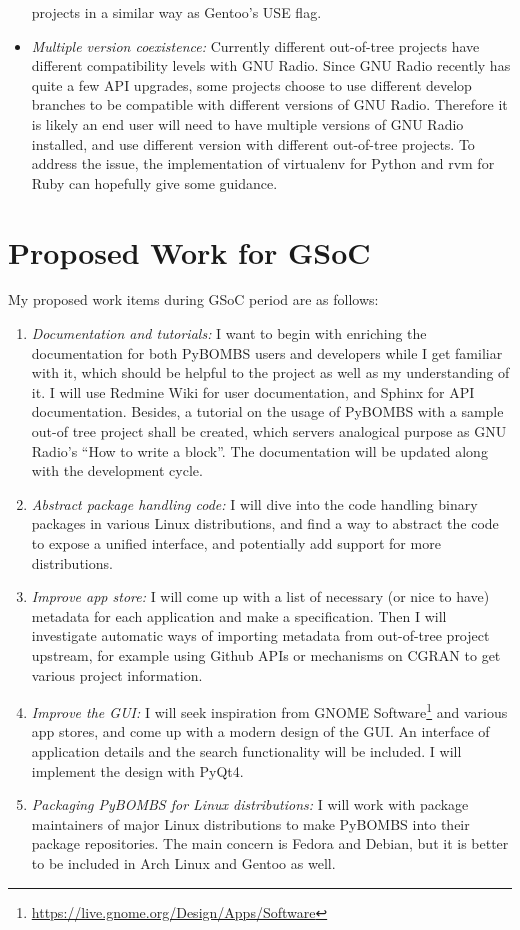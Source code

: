 \documentclass[a4paper]{article}
\begin{document}
\begin{itemize}
    projects in a similar way as Gentoo's USE flag.
  \item \emph{Multiple version coexistence:} Currently different
    out-of-tree projects have different compatibility levels with GNU
    Radio. Since GNU Radio recently has quite a few API upgrades,
    some projects choose to use different develop branches to be
    compatible with different versions of GNU Radio. Therefore it is
    likely an end user will need to have multiple versions of GNU Radio
    installed, and use different version with different out-of-tree
    projects. To address the issue, the implementation of
    virtualenv for Python and rvm for Ruby can hopefully give some guidance.
\end{itemize}

\section{Proposed Work for GSoC}

My proposed work items during GSoC period are as follows:

\begin{enumerate}
  \item \emph{Documentation and tutorials:} I want to begin with
    enriching the documentation for both PyBOMBS users and developers
    while I get familiar with it, which should be helpful to the
    project as well as my understanding of it. I will use Redmine Wiki
    for user documentation, and Sphinx for API documentation.
    Besides, a tutorial on the usage of PyBOMBS with a sample out-of\-
    tree project shall be created, which servers analogical purpose as
    GNU Radio's ``How to write a block''. The documentation will be
    updated along with the development cycle.
  \item \emph{Abstract package handling code:} I will dive into the
    code handling binary packages in various Linux distributions, and
    find a way to abstract the code to expose a unified interface, and
    potentially add support for more distributions.
  \item \emph{Improve app store:} I will come up with a list of
    necessary (or nice to have) metadata for each application and make a
    specification. Then I will investigate automatic ways of importing
    metadata from out-of-tree project upstream, for example using Github
    APIs or mechanisms on CGRAN to get various project information.
  \item \emph{Improve the GUI:} I will seek inspiration from GNOME
    Software\footnote{\url{https://live.gnome.org/Design/Apps/Software}}
    and various app stores, and come up with a modern design
    of the GUI. An interface of application details and the search
    functionality will be included. I will implement the design with
    PyQt4.
  \item \emph{Packaging PyBOMBS for Linux distributions:} I will
    work with package maintainers of major Linux distributions to make
    PyBOMBS into their package repositories. The main concern is Fedora
    and Debian, but it is better to be included in Arch Linux and Gentoo
    as well.
\end{enumerate}
\end{document}
